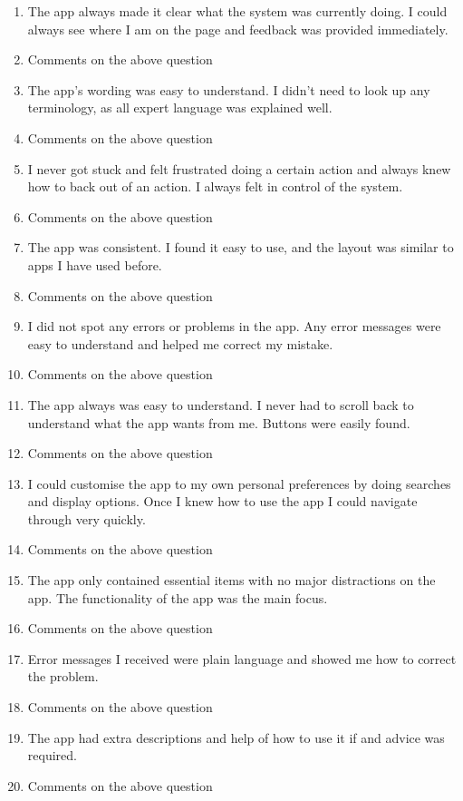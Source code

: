 \documentclass{l4proj}
\begin{document}
\begin{appendices}
\begin{enumerate}
    \item The app always made it clear what the system was currently doing. I could always see where I am on the page and feedback was provided immediately.
    \item Comments on the above question
    \item The app's wording was easy to understand. I didn't need to look up any terminology, as all expert language was explained well.
    \item Comments on the above question
    \item I never got stuck and felt frustrated doing a certain action and always knew how to back out of an action. I always felt in control of the system.
    \item Comments on the above question
    \item The app was consistent. I found it easy to use, and the layout was similar to apps I have used before.
    \item Comments on the above question
    \item I did not spot any errors or problems in the app. Any error messages were easy to understand and helped me correct my mistake.
    \item Comments on the above question
    \item The app always was easy to understand. I never had to scroll back to understand what the app wants from me. Buttons were easily found.
    \item Comments on the above question
    \item I could customise the app to my own personal preferences by doing searches and display options. Once I knew how to use the app I could navigate through very quickly.
    \item Comments on the above question
    \item The app only contained essential items with no major distractions on the app. The functionality of the app was the main focus.
    \item Comments on the above question
    \item Error messages I received were plain language and showed me how to correct the problem.
    \item Comments on the above question
    \item The app had extra descriptions and help of how to use it if and advice was required.
    \item Comments on the above question
\end{enumerate}


\end{appendices}
\end{document}
